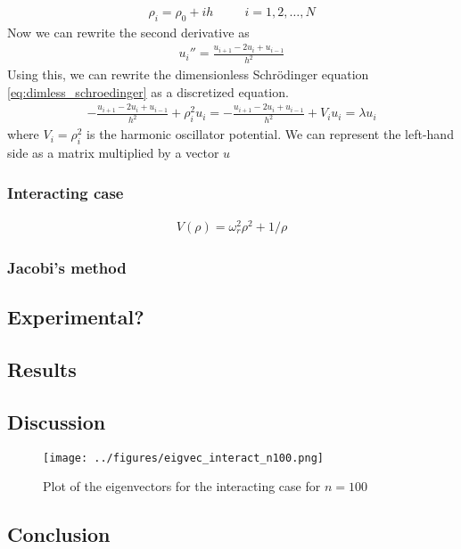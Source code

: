 \documentclass{article}
\begin{document}
\begin{align*}
  \rho_i = \rho_0 + ih\;\;\;\;\;\;\;\;\;i=1,2,\dots,N
\end{align*}
Now we can rewrite the second derivative as
\begin{align*}
  u_i'' = \frac{u_{i+1}-2u_i + u_{i-1}}{h^2}
\end{align*}
Using this, we can rewrite the dimensionless Schrödinger equation \eqref{eq:dimless_schroedinger} as a discretized equation.
\begin{align*}
  -\frac{u_{i+1}-2u_i+u_{i-1}}{h^2} + \rho_i^2u_i = -\frac{u_{i+1}-2u_i+u_{i-1}}{h^2} + V_iu_i = \lambda u_i 
\end{align*}
where $V_i = \rho_i^2$ is the harmonic oscillator potential. We can represent the left-hand side as a matrix multiplied by a vector $u$
\subsubsection*{Interacting case}
\begin{align*}
  V(\rho) = \omega_r^2\rho^2 + 1/\rho
\end{align*}
\subsubsection{Jacobi's method}
\subsection{Experimental?}
\subsection{Results}
\subsection{Discussion}
\begin{figure}[H]
  \centering
  \texttt{[image: ../figures/eigvec\_interact\_n100.png]}
  \caption{Plot of the eigenvectors for the interacting case for $n=100$}
  \label{fig:eigvec100}
\end{figure}
\subsection{Conclusion}

\end{document}
